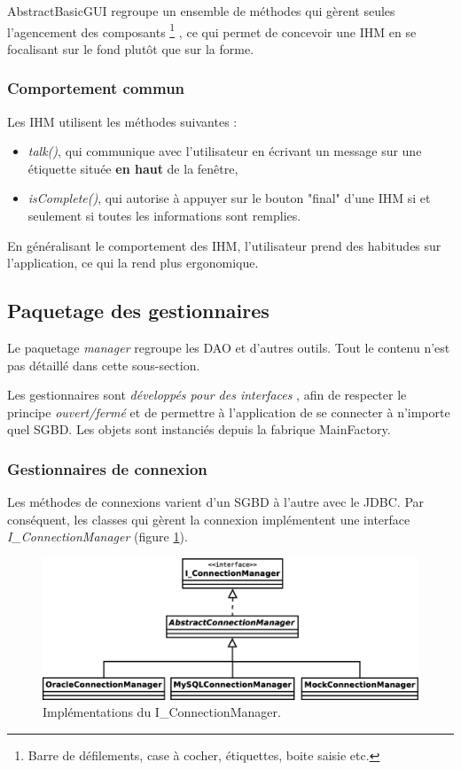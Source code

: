 AbstractBasicGUI regroupe un ensemble de méthodes qui gèrent seules l'agencement des composants
\footnote{\label{composants_ihm}Barre de défilements, case à cocher, étiquettes, boite saisie etc.}
, ce qui permet de concevoir une IHM en se focalisant sur le fond plutôt que sur la forme.

\subsubsection{Comportement commun}
Les IHM utilisent les méthodes suivantes :
\begin{itemize}
\item \textit{talk()}, qui communique avec l'utilisateur en écrivant un message sur une étiquette située \textbf{en haut} de la fenêtre,
\item \textit{isComplete()}, qui autorise à appuyer sur le bouton "final" d'une IHM si et seulement si toutes les informations sont remplies.
\end{itemize}

En généralisant le comportement des IHM, l'utilisateur prend des habitudes sur l'application, ce qui la rend plus ergonomique.

\subsection{Paquetage des gestionnaires}
Le paquetage \textit{manager} regroupe les DAO et d'autres outils.
Tout le contenu n'est pas détaillé dans cette sous-section.

Les gestionnaires sont \textit{développés pour des interfaces} , afin de respecter le principe \textit{ouvert/fermé} et de permettre à l'application de se connecter à n'importe quel SGBD.
Les objets sont instanciés depuis la fabrique MainFactory.

\subsubsection{Gestionnaires de connexion}
Les méthodes de connexions varient d'un SGBD à l'autre avec le \gls{JDBC}.
Par conséquent, les classes qui gèrent la connexion implémentent une interface \textit{I\_ConnectionManager} (figure \ref{connection_managers_uml}).

\begin{figure}[!h]
\centering
\includegraphics[width=14cm]{images/connection_managers.eps}
\caption{Implémentations du I\_ConnectionManager.}
\label{connection_managers_uml}
\end{figure}

